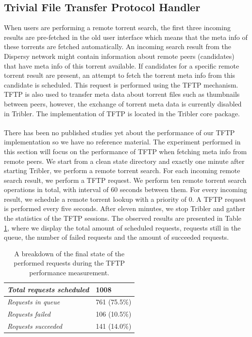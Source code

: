 \subsection{Trivial File Transfer Protocol Handler}
When users are performing a remote torrent search, the first three incoming results are pre-fetched in the old user interface which means that the meta info of these torrents are fetched automatically. An incoming search result from the Dispersy network might contain information about remote peers (candidates) that have meta info of this torrent available. If candidates for a specific remote torrent result are present, an attempt to fetch the torrent meta info from this candidate is scheduled. This request is performed using the TFTP mechanism\cite{sollins1992tftp}. TFTP is also used to transfer meta data about torrent files such as thumbnails between peers, however, the exchange of torrent meta data is currently disabled in Tribler. The implementation of TFTP is located in the Tribler core package.\\\\
There has been no published studies yet about the performance of our TFTP implementation so we have no reference material. The experiment performed in this section will focus on the performance of TFTP when fetching meta info from remote peers. We start from a clean state directory and exactly one minute after starting Tribler, we perform a remote torrent search. For each incoming remote search result, we perform a TFTP request. We perform ten remote torrent search operations in total, with interval of 60 seconds between them. For every incoming result, we schedule a remote torrent lookup with a priority of 0. A TFTP request is performed every five seconds. After eleven minutes, we stop Tribler and gather the statistics of the TFTP sessions. The observed results are presented in Table \ref{table:tftp-performance}, where we display the total amount of scheduled requests, requests still in the queue, the number of failed requests and the amount of succeeded requests.\\

\begin{table}[h!]
	\centering
	\begin{tabular}{|l|l|}
		\hline
		\emph{Total requests scheduled} & 1008 \\ \hline
		\emph{Requests in queue} & 761 (75.5\%)\\ \hline
		\emph{Requests failed} & 106 (10.5\%)\\ \hline
		\emph{Requests succeeded} & 141 (14.0\%)\\ \hline
	\end{tabular}
	\caption{A breakdown of the final state of the performed requests during the TFTP performance measurement.}
	\label{table:tftp-performance}
\end{table}

